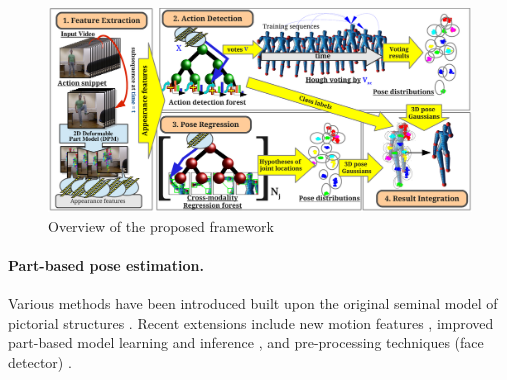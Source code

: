 \begin{figure}[ht]
	\centering
	\includegraphics[width=1\linewidth]{fig/body/figure3_overview.pdf}
	\caption{Overview of the proposed framework}
	\label{fig/body/overview}
\end{figure} 

\paragraph{Part-based pose estimation.} 
Various methods have been introduced built upon the original seminal model of pictorial structures \cite{Felzenszwalb2000, Felzenszwalb2010}. Recent extensions include new motion features \cite{Andriluka2009}, improved part-based model learning and inference \cite{Yang2011, Sun2012a}, and pre-processing techniques (\eg face detector) \cite{Eichner2012}. 


